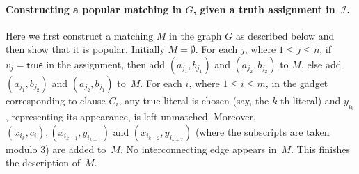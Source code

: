 \documentclass[11pt]{llncs}
\begin{document}
\paragraph{Constructing a popular matching in $G$, given a truth assignment in~$\mathcal{I}$.}
Here we first construct a matching $M$ in the graph $G$ as described below and then show that it is popular. Initially $M = \emptyset$.
For each $j$, where $1 \le j \le n$, if $v_j = \mathsf{true}$ in the assignment, then add $(a_{j_1}, b_{j_1})$ and $(a_{j_2}, b_{j_2})$ to $M$, 
else add $(a_{j_1}, b_{j_2})$ and $(a_{j_2}, b_{j_1})$ to~$M$. 
For each $i$, where $1 \le i \le m$, in the gadget corresponding to clause $C_i$, any true literal is chosen (say, the $k$-th literal) and 
$y_{i_k}$, representing its appearance, is left unmatched. Moreover, $(x_{i_k}, c_i), (x_{i_{k+1}}, y_{i_{k+1}})$ and $(x_{i_{k+2}}, y_{i_{k+2}})$ (where
the subscripts are taken modulo 3) are added to~$M$. No interconnecting edge appears in~$M$. This finishes the description of~$M$.
\end{document}
